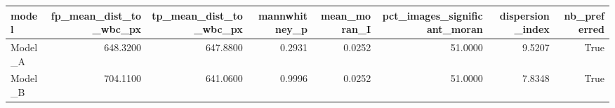 \begin{tabular}{lrrrrrrr}
\toprule
model & fp_mean_dist_to_wbc_px & tp_mean_dist_to_wbc_px & mannwhitney_p & mean_moran_I & pct_images_significant_moran & dispersion_index & nb_preferred \\
\midrule
Model_A & 648.3200 & 647.8800 & 0.2931 & 0.0252 & 51.0000 & 9.5207 & True \\
Model_B & 704.1100 & 641.0600 & 0.9996 & 0.0252 & 51.0000 & 7.8348 & True \\
\bottomrule
\end{tabular}
